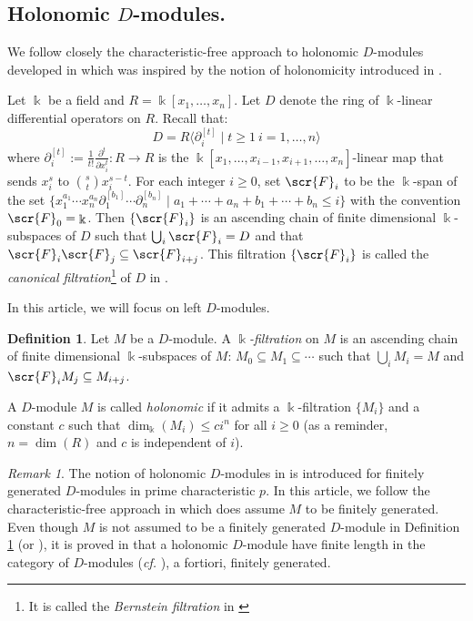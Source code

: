 \documentclass[11pt]{amsart}
\theoremstyle{definition}
\newtheorem{definition}[theorem]{Definition}
\theoremstyle{remark}
\newtheorem{remark}[theorem]{Remark}
\numberwithin{equation}{subsection}
\DeclareMathOperator{\kk}{\Bbbk}
\begin{document}
\subsection{Holonomic $D$-modules.} We follow closely the characteristic-free approach to holonomic $D$-modules developed in \cite{LyubeznikHolonomic} which was inspired by the notion of holonomicity introduced in \cite{BavulaHolonomic}. 

Let $\kk$ be a field and $R=\kk[x_1,\dots,x_n]$. Let $D$ denote the ring of $\kk$-linear differential operators on $R$. Recall that: 
\[D=R\langle \partial^{[t]}_i\mid t\geq 1\ i=1,\dots,n\rangle\]
where $\partial^{[t]}_i:=\frac{1}{t!}\frac{\partial^t}{\partial x^t_i}:R\to R$ is the $\kk[x_1,\dots,x_{i-1},x_{i+1},\dots,x_n]$-linear map that sends $x^s_i$ to $\binom{s}{t}x^{s-t}_i$. For each integer $i\geq 0$, set $\scr{F}_i$ to be the $\kk$-span of the set $\{x^{a_1}_1\cdots x^{a_n}_n\partial^{[b_1]}_1\cdots \partial^{[b_n]}_n\mid a_1+\cdots+a_n+b_1+\cdots+b_n\leq i\}$ with the convention $\scr{F}_0=\kk$. Then $\{\scr{F}_i\}$ is an ascending chain of finite dimensional $\kk$-subspaces of $D$ such that $\bigcup_i\scr{F}_i=D$ and that $\scr{F}_i\scr{F}_j\subseteq \scr{F}_{i+j}$. This filtration $\{\scr{F}_i\}$ is called the \emph{canonical filtration}\footnote{It is called the {\it Bernstein filtration} in \cite{LyubeznikHolonomic}} of $D$ in \cite{BavulaHolonomic}.

In this article, we will focus on left $D$-modules. 

\begin{definition}
\label{defn: holonomic}
Let $M$ be a $D$-module. A \emph{$\kk$-filtration} on $M$ is an ascending chain of finite dimensional $\kk$-subspaces of $M$: $M_0\subseteq M_1\subseteq \cdots$ such that $\bigcup_iM_i=M$ and $\scr{F}_iM_j\subseteq M_{i+j}$.

A $D$-module $M$ is called \emph{holonomic} if it admits a $\kk$-filtration $\{M_i\}$ and a constant $c$ such that $\dim_{\kk}(M_i)\leq ci^n$ for all $i\geq 0$ (as a reminder, $n=\dim(R)$ and $c$ is independent of $i$).
\end{definition}

\begin{remark}
The notion of holonomic $D$-modules in \cite[p.198]{BavulaHolonomic} is introduced for finitely generated $D$-modules in prime characteristic $p$. In this article, we follow the characteristic-free approach in \cite[Definition 3.4]{LyubeznikHolonomic} which does assume $M$ to be finitely generated. Even though $M$ is not assumed to be a finitely generated $D$-module in Definition \ref{defn: holonomic} (or \cite[Definition 3.4]{LyubeznikHolonomic}), it is proved in \cite[Theorem 3.5]{LyubeznikHolonomic} that a holonomic $D$-module have finite length in the category of $D$-modules ({\it cf.} \cite[Theorem 9.6]{BavulaHolonomic}), a fortiori, finitely generated.
\end{remark}
\end{document}
